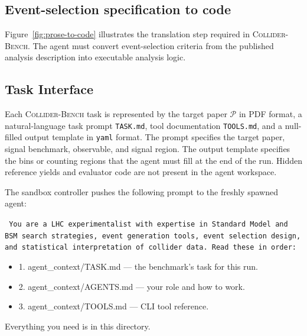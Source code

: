 \documentclass{article}
\newcommand{\ColliderBench}{\textsc{Collider-Bench}}
\begin{document}
\subsection{Event-selection specification to code}
\label{app:prose-to-code}

Figure~\ref{fig:prose-to-code} illustrates the translation step required in \ColliderBench{}. The agent must convert event-selection criteria from the published analysis description into executable analysis logic.

\subsection{Task Interface}
\label{app:task-interface}

Each \ColliderBench{} task is represented by the target paper \(\mathcal{P}\) in PDF format, a natural-language task prompt \texttt{TASK.md}, tool documentation \texttt{TOOLS.md}, and a null-filled output template in \texttt{yaml} format. The prompt specifies the target paper, signal benchmark, observable, and signal region. The output template specifies the bins or counting regions that the agent must fill at the end of the run. Hidden reference yields and evaluator code are not present in the agent workspace.

The sandbox controller pushes the following prompt to the freshly spawned agent:\\

{\tt \small
        You are a LHC experimentalist with expertise in Standard Model and BSM
        search strategies, event generation tools, event selection design, and
        statistical interpretation of collider data.
        Read these in order:
        \begin{itemize}
        \item 1. agent\_context/TASK.md   — the benchmark's task for this run.
        \item 2. agent\_context/AGENTS.md — your role and how to work.
        \item 3. agent\_context/TOOLS.md  — CLI tool reference.
        \end{itemize}
        Everything you need is in this directory.
}

\vspace{10pt}
\end{document}

